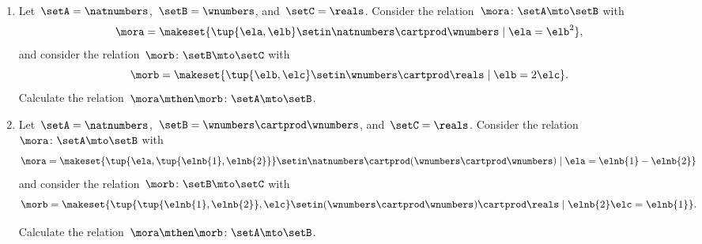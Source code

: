 

\begin{gradedexercise}[ComposingRelations]
    \
    \begin{enumerate}
        \item Let~$\setA = \natnumbers$,~$\setB = \wnumbers$, and~$\setC = \reals$.
              Consider the relation~$\mora \colon \setA \mto \setB$ with
              \begin{equation}
                  \mora = \makeset{ \tup{\ela, \elb} \setin \natnumbers \cartprod \wnumbers \mid \ela = \elb^2 },
              \end{equation}
              and consider the relation~$\morb \colon \setB \mto \setC$ with
              \begin{equation}
                  \morb = \makeset{ \tup{\elb, \elc} \setin \wnumbers \cartprod \reals \mid \elb = 2 \elc}.
              \end{equation}
              Calculate the relation~$\mora \mthen \morb \colon \setA \mto \setB$.

        \item Let~$\setA = \natnumbers$,~$\setB = \wnumbers \cartprod \wnumbers$, and~$\setC = \reals$.
              Consider the relation~$\mora \colon \setA \mto \setB$ with
              \begin{equation}
                  \mora = \makeset{\tup{\ela, \tup{\elnb{1}, \elnb{2}}} \setin \natnumbers \cartprod (\wnumbers \cartprod \wnumbers) \mid \ela = \elnb{1} - \elnb{2}}
              \end{equation}
              and consider the relation~$\morb \colon \setB \mto \setC$ with
              \begin{equation}
                  \morb = \makeset{ \tup{\tup{\elnb{1}, \elnb{2}}, \elc} \setin (\wnumbers \cartprod \wnumbers) \cartprod \reals \mid \elnb{2} \elc = \elnb{1}}.
              \end{equation}

              Calculate the relation~$\mora \mthen \morb \colon \setA \mto \setB$.
    \end{enumerate}
\end{gradedexercise}
